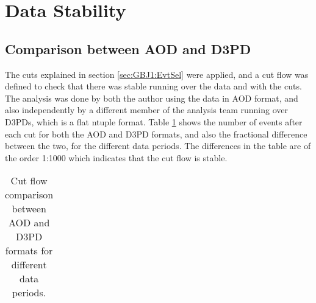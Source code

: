 \section{Data Stability}
\label{sec:GBJ1:DataStab}

\subsection{Comparison between AOD and D3PD}
\label{sec:GBJ1:AODD3PD}

The cuts explained in section \ref{sec:GBJ1:EvtSel} were applied, and a cut flow was defined to check that there was stable running over the data and with the cuts. The analysis was done by both the author using the data in AOD format, and also independently by a different member of the analysis team running over D3PDs, which is a flat ntuple format. Table \ref{GBJ1:CutFlow} shows the number of events after each cut for both the AOD and D3PD formats, and also the fractional difference between the two, for the different data periods. The differences in the table are of the order 1:1000 which indicates that the cut flow is stable.  

   
\begin{table}
\small
\footnotesize

\begin{tabular}{|c|c|c|c|c|c|c|c|}
\hline
%

%
\hline
\end{tabular}
\caption[Cut flow comparison between AOD and D3PD formats]{Cut flow comparison between AOD and D3PD formats for different data periods.}
\label{GBJ1:CutFlow}
\end{table}
